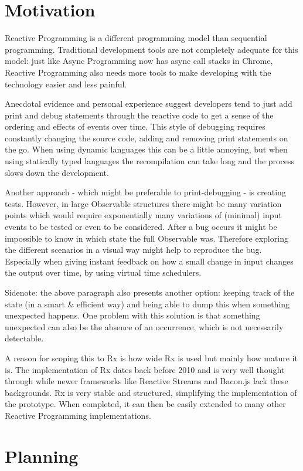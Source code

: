 \documentclass[11pt,a4paper]{article}
\begin{document}
\section{Motivation} Reactive Programming is a different programming
model than sequential programming.  Traditional development tools are
not completely adequate for this model:  just like Async Programming now
has async call stacks in Chrome, Reactive Programming also needs more
tools to make developing with the technology easier and less painful.

Anecdotal evidence and personal experience suggest developers tend to
just add print and debug statements through the reactive code to get a
sense of the ordering and effects of events over time.  This style of
debugging requires constantly changing the source code, adding and
removing print statements on the go.  When using dynamic languages this
can be a little annoying, but when using statically typed languages the
recompilation can take long and the process slows down the development.

Another approach - which might be preferable to print-debugging - is
creating tests.  However, in large Observable structures there might be
many variation points which would require exponentially many variations
of (minimal) input events to be tested or even to be considered.  After
a bug occurs it might be impossible to know in which state the full
Observable was.  Therefore exploring the different scenarios in a visual
way might help to reproduce the bug.  Especially when giving instant
feedback on how a small change in input changes the output over time, by
using virtual time schedulers.

Sidenote:  the above paragraph also presents another option:  keeping
track of the state (in a smart \& efficient way) and being able to dump
this when something unexpected happens.  One problem with this solution
is that something unexpected can also be the absence of an occurrence,
which is not necessarily detectable.

A reason for scoping this to Rx is how wide Rx is used but mainly how
mature it is.  The implementation of Rx dates back before 2010 and is
very well thought through while newer frameworks like Reactive Streams
and Bacon.js lack these backgrounds.  Rx is very stable and structured,
simplifying the implementation of the prototype.  When completed, it can
then be easily extended to many other Reactive Programming
implementations.

\section{Planning}
\end{document}
